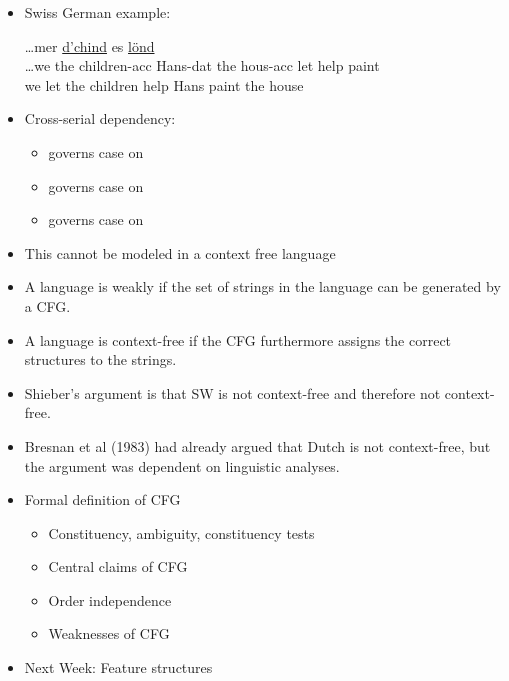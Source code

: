 \documentclass[a4paper,landscape,headrule,footrule]{foils}
\begin{document}
\begin{itemize}
\item Swiss German example:
  \begin{exe}
    \ex \gll \ldots mer \uline{d’chind}  es  \uline{l\"ond}  \\
    \ldots we {the children-acc} Hans-dat the hous-acc let help paint \\
    \trans we let {the children} help Hans paint the house 
  \end{exe}
\item Cross-serial dependency:
\begin{itemize}
\item {} governs case on 
\item {} governs case on 
\item {} governs case on 
\end{itemize}
\item This cannot be modeled in a context free language
\end{itemize}

\begin{itemize}
\item A language is weakly  if the set of
strings in the language can be generated by a CFG.
\item A language is  context-free if the CFG
furthermore assigns the correct structures to the
strings.
\item Shieber’s argument is that SW is not 
context-free and therefore not  context-free.
\item Bresnan et al (1983) had already argued that Dutch
is  not context-free, but the argument was
dependent on linguistic analyses.
\end{itemize}






\begin{itemize}
\item Formal definition of CFG
  \begin{itemize}
  \item Constituency, ambiguity, constituency tests
  \item Central claims of CFG
  \item Order independence
  \item Weaknesses of CFG
  \end{itemize}
\item Next Week: Feature structures
\end{itemize}
\end{document}
